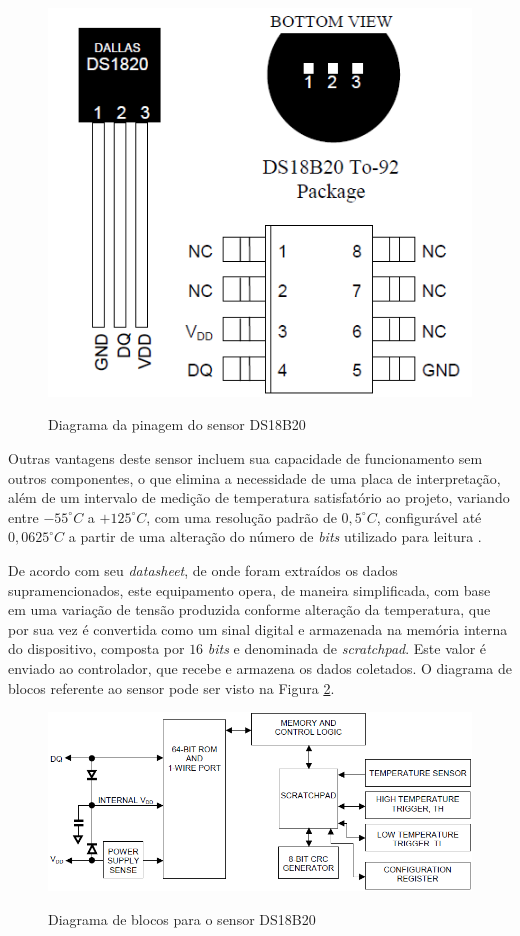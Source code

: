 \documentclass[acronym,symbols,table]{fei}
\begin{document}
\begin{figure}[!htb]
\centering
    \caption{Diagrama da pinagem do sensor DS18B20}
    \includegraphics[width=0.30\linewidth]{Imagens/PinTemp.png}
    \label{fig:PinTemp}
\end{figure}

\newpage

Outras vantagens deste sensor incluem sua capacidade de funcionamento sem outros componentes, o que elimina a necessidade de uma placa de interpretação, além de um intervalo de medição de temperatura satisfatório ao projeto, variando entre ${-55}^{\circ}C$ a ${+125}^{\circ}C$, com uma resolução padrão de $0,5^{\circ}C$, configurável até $0,0625^{\circ}C$ a partir de uma alteração do número de \textit{bits} utilizado para leitura \cite{DS18B20}.

De acordo com seu \textit{datasheet}, de onde foram extraídos os dados supramencionados, este equipamento opera, de maneira simplificada, com base em uma variação de tensão produzida conforme alteração da temperatura, que por sua vez é convertida como um sinal digital e armazenada na memória interna do dispositivo, composta por $16$ \textit{bits} e denominada de \textit{scratchpad}. Este valor é enviado ao controlador, que recebe e armazena os dados coletados. O diagrama de blocos referente ao sensor pode ser visto na Figura \ref{fig:DiagBlocTemp}. 

\begin{figure}[!htb]
\centering
    \caption{Diagrama de blocos para o sensor DS18B20}
    \includegraphics[width=0.8\linewidth]{Imagens/DiagBlocTemp.png}
    \label{fig:DiagBlocTemp}
\end{figure}
\end{document}
